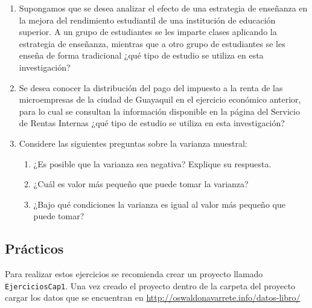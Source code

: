 \documentclass[letterpaper,]{book}
\providecommand{\tightlist}{%
  \setlength{\itemsep}{0pt}\setlength{\parskip}{0pt}}
\begin{document}
\begin{enumerate}
\def\labelenumi{\arabic{enumi}.}
\item
  Supongamos que se desea analizar el efecto de una estrategia de enseñanza en la mejora del rendimiento estudiantil de una institución de educación superior. A un grupo de estudiantes se les imparte clases aplicando la estrategia de enseñanza, mientras que a otro grupo de estudiantes se les enseña de forma tradicional ¿qué tipo de estudio se utiliza en esta investigación?
\item
  Se desea conocer la distribución del pago del impuesto a la renta de las microempresas de la ciudad de Guayaquil en el ejercicio económico anterior, para lo cual se consultan la información disponible en la página del Servicio de Rentas Internas ¿qué tipo de estudio se utiliza en esta investigación?
\item
  Considere las siguientes preguntas sobre la varianza muestral:

  \begin{enumerate}
  \def\labelenumii{\alph{enumii}.}
  \tightlist
  \item
    ¿Es posible que la varianza sea negativa? Explique su respuesta.
  \item
    ¿Cuál es valor más pequeño que puede tomar la varianza?
  \item
    ¿Bajo qué condiciones la varianza es igual al valor más pequeño que puede tomar?
  \end{enumerate}
\end{enumerate}

\hypertarget{practicos}{%
\subsection{Prácticos}\label{practicos}}

Para realizar estos ejercicios se recomienda crear un proyecto llamado \texttt{EjerciciosCap1}. Una vez creado el proyecto dentro de la carpeta del proyecto cargar los datos que se encuentran en \url{http://oswaldonavarrete.info/datos-libro/}
\end{document}
